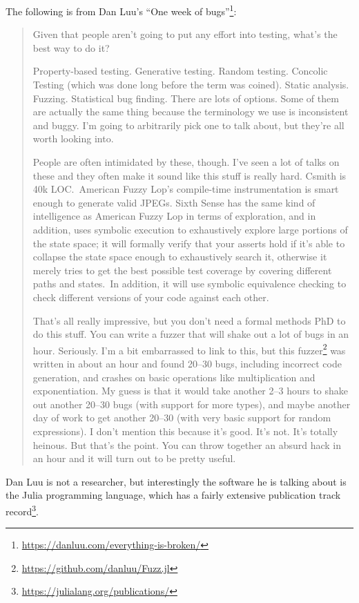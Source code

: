 The following is from Dan Luu's ``One week of bugs''\footnote{\url{https://danluu.com/everything-is-broken/}}:

\begin{quote}
Given that people aren't going to put any effort into testing, what's the best way to do it?

Property-based testing. Generative testing. Random testing. Concolic Testing (which was done long before the term was coined). Static analysis. Fuzzing. Statistical bug finding. There are lots of options. Some of them are actually the same thing because the terminology we use is inconsistent and buggy. I'm going to arbitrarily pick one to talk about, but they're all worth looking into.

People are often intimidated by these, though.
I've seen a lot of talks on these and they often make it sound like this stuff is really hard.
Csmith is 40k LOC.\ 
American Fuzzy Lop's compile-time instrumentation is smart enough to generate valid JPEGs.
Sixth Sense has the same kind of intelligence as American Fuzzy Lop in terms of exploration, and in addition, uses symbolic execution to exhaustively explore large portions of the state space; it will formally verify that your asserts hold if it's able to collapse the state space enough to exhaustively search it, otherwise it merely tries to get the best possible test coverage by covering different paths and states.\ In addition, it will use symbolic equivalence checking to check different versions of your code against each other.

That's all really impressive, but you don't need a formal methods PhD to do this stuff.
You can write a fuzzer that will shake out a lot of bugs in an hour.
Seriously.
I'm a bit embarrassed to link to this, but this fuzzer\footnote{\url{https://github.com/danluu/Fuzz.jl}} was written in about an hour and found 20--30 bugs,
including incorrect code generation,
and crashes on basic operations like multiplication and exponentiation.
My guess is that it would take another 2--3 hours to shake out another 20--30 bugs (with support for more types), and maybe another day of work to get another 20--30 (with very basic support for random expressions).
I don't mention this because it's good.
It's not.
It's totally heinous.
But that's the point.
You can throw together an absurd hack in an hour and it will turn out to be pretty useful.
\end{quote}

Dan Luu is not a researcher,
but interestingly the software he is talking about is the Julia programming language\cite{DBLP:journals/corr/abs-1209-5145},
which has a fairly extensive publication track record\footnote{\url{https://julialang.org/publications/}}. 

